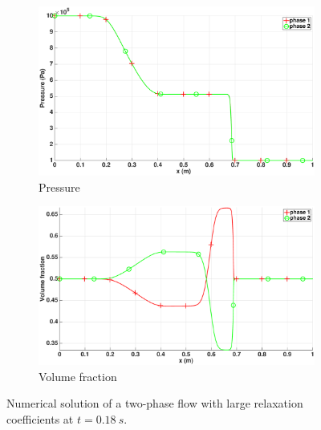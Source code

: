 \begin{figure}[H]
        \begin{subfigure}[b]{0.495\textwidth}
                \centering
                \includegraphics[width=\textwidth]{figures/relaxation_two_phases_pressure.eps}                
                \caption{Pressure}
                \label{fig:two-phase-press}
        \end{subfigure}        
        \begin{subfigure}[b]{0.495\textwidth}
                \centering
                \includegraphics[width=\textwidth]{figures/relaxation_two_phases_volume_fraction.eps}                
                \caption{Volume fraction}
                \label{fig:two-phase-vf}
        \end{subfigure}
        \caption{Numerical solution of a two-phase flow with large relaxation coefficients at $t=0.18 \ s$.}\label{fig:two-phase}
\end{figure}

